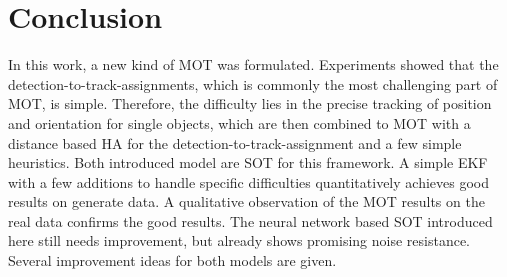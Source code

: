 \documentclass[12pt,a4paper]{article}
\begin{document}

\section{Conclusion}

In this work, a new kind of MOT was formulated. Experiments showed that the detection-to-track-assignments, which is commonly the most challenging part of MOT, is simple. Therefore, the difficulty lies in the precise tracking of position and orientation for single objects, which are then combined to MOT with a distance based HA for the detection-to-track-assignment and a few simple heuristics. Both introduced model are SOT for this framework. A simple EKF with a few additions to handle specific difficulties quantitatively achieves good results on generate data. A qualitative observation of the MOT results on the real data confirms the good results. The neural network based SOT introduced here still needs improvement, but already shows promising noise resistance. Several improvement ideas for both models are given.
\end{document}
